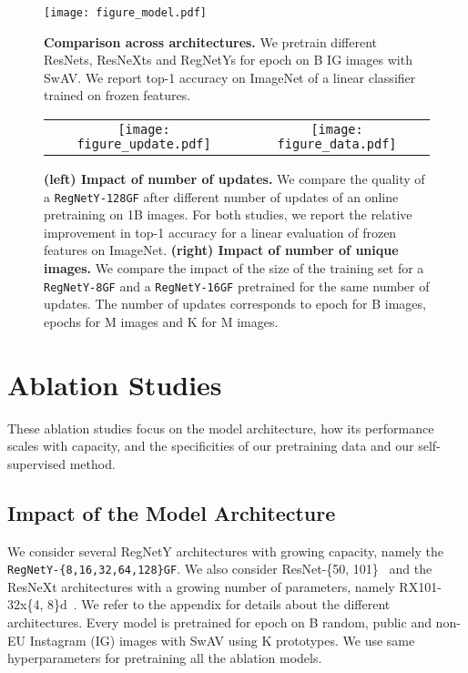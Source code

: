 \documentclass[final]{cvpr}
\renewcommand{\paragraph}[1]{\vspace{0.07in}\noindent {\bf #1}}
\begin{document}
\begin{figure}[h]
  \centering
  \texttt{[image: figure\_model.pdf]}
  \caption{\textbf{Comparison across architectures.} 
We pretrain different ResNets, ResNeXts and RegNetYs for  epoch on B IG images with SwAV.
We report top-1 accuracy on ImageNet of a linear classifier trained on frozen features.}
\label{fig:model}
\end{figure}

\begin{figure*}[t]
\begin{tabular}{cc}
  \texttt{[image: figure\_update.pdf]}&
  \texttt{[image: figure\_data.pdf]} 
\end{tabular}
  \caption{
\textbf{(left) Impact of number of updates.}
We compare the quality of a \texttt{RegNetY-128GF} after different number of updates of an online pretraining on 1B images.
For both studies, we report the relative improvement in top-1 accuracy for a linear evaluation of frozen features on ImageNet.
\textbf{(right) Impact of number of unique images.}
We compare the impact of the size of the training set for a \texttt{RegNetY-8GF} and a \texttt{RegNetY-16GF} pretrained for the same number of updates.
The number of updates corresponds to  epoch for B images,  epochs for M images and K for M images.
}
\label{fig:data}
\end{figure*}


\section{Ablation Studies}

These ablation studies focus on the model architecture, how its performance scales with capacity, and the specificities of our pretraining data and our self-supervised method.

\subsection{Impact of the Model Architecture}


\paragraph{Experimental setting.} 
We consider several RegNetY architectures with growing capacity, namely the \texttt{RegNetY-\{8,16,32,64,128\}GF}.
We also consider ResNet-\{50, 101\}~\cite{he2016deep} and the ResNeXt architectures with a growing number of parameters, namely RX101-32x\{4, 8\}d~\cite{xie2017aggregated}.
We refer to the appendix for details about the different architectures. 
Every model is pretrained for  epoch on B random, public and non-EU Instagram (IG) images with SwAV using K prototypes. We use same hyperparameters for pretraining all the ablation models.
\end{document}
